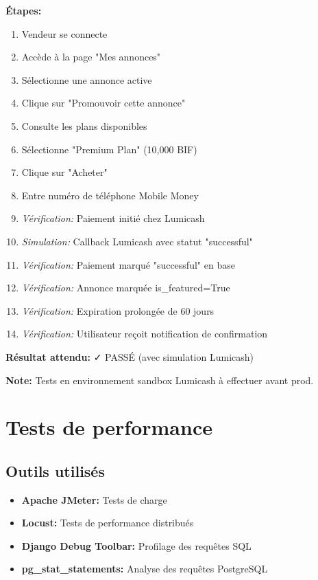 \textbf{Étapes:}
\begin{enumerate}
    \item Vendeur se connecte
    \item Accède à la page "Mes annonces"
    \item Sélectionne une annonce active
    \item Clique sur "Promouvoir cette annonce"
    \item Consulte les plans disponibles
    \item Sélectionne "Premium Plan" (10,000 BIF)
    \item Clique sur "Acheter"
    \item Entre numéro de téléphone Mobile Money
    \item \textit{Vérification:} Paiement initié chez Lumicash
    \item \textit{Simulation:} Callback Lumicash avec statut "successful"
    \item \textit{Vérification:} Paiement marqué "successful" en base
    \item \textit{Vérification:} Annonce marquée is\_featured=True
    \item \textit{Vérification:} Expiration prolongée de 60 jours
    \item \textit{Vérification:} Utilisateur reçoit notification de confirmation
\end{enumerate}

\textbf{Résultat attendu:} ✓ PASSÉ (avec simulation Lumicash)

\textbf{Note:} Tests en environnement sandbox Lumicash à effectuer avant prod.

\section{Tests de performance}

\subsection{Outils utilisés}

\begin{itemize}
    \item \textbf{Apache JMeter:} Tests de charge
    \item \textbf{Locust:} Tests de performance distribués
    \item \textbf{Django Debug Toolbar:} Profilage des requêtes SQL
    \item \textbf{pg\_stat\_statements:} Analyse des requêtes PostgreSQL
\end{itemize}

